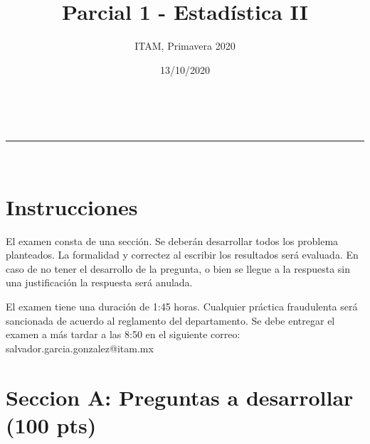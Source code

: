 \documentclass[addpoints]{exam}
\makeatletter
\newcommand{\linia}{\rule{\linewidth}{0.5pt}}
\theoremstyle{mytheor}
\renewcommand{\maketitle}{
    \begin{center}
    \vspace{2ex}
    {\huge \textsc{\@title}}
    \vspace{1ex}
    \\
    \linia\\
    \@author \hfill \@date
    \vspace{4ex}
    \end{center}
  }
\makeatother
\begin{document}
  
  \title{Parcial 1 - Estadística II}
  
  \author{ITAM, Primavera 2020}
  
  \date{13/10/2020}
  
  \maketitle
  
  \section*{Instrucciones}
  
 El examen consta de una sección. Se deberán desarrollar todos los problema planteados. La formalidad y correctez al escribir los resultados será evaluada. En caso de no tener el desarrollo de la pregunta, o bien se llegue a la respuesta sin una justificación la respuesta será anulada. 
  
  \vspace{10pt}
  
El examen tiene una duración de 1:45 horas. Cualquier práctica fraudulenta será sancionada de acuerdo al reglamento del departamento. Se debe entregar el examen a más tardar a las 8:50 en el siguiente correo: salvador.garcia.gonzalez@itam.mx

  \section*{Seccion A: Preguntas a desarrollar (100 pts)}
 
\end{document}
